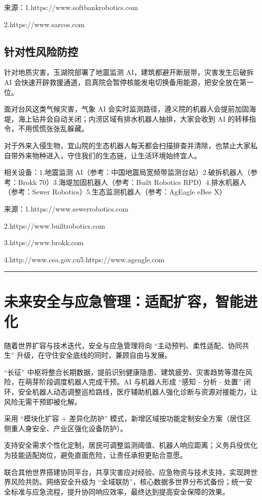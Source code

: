 来源：1.https://www.softbankrobotics.com

2.https://www.sarcos.com

\subsection{针对性风险防控}\label{ux9488ux5bf9ux6027ux98ceux9669ux9632ux63a7}

针对地质灾害，玉湖院部署了地震监测 AI，建筑都避开断层带，灾害发生后破拆 AI 会快速开辟救援通道，启真院会暂停核能发电切换备用能源，把安全放在第一位。

面对台风这类气候灾害，气象 AI 会实时监测路径，遵义院的机器人会提前加固海堤，海上钻井会自动关闭；内涝区域有排水机器人抽排，大家会收到 AI 的转移指令，不用慌慌张张乱躲藏。

对于外来入侵生物，宜山院的生态机器人每天都会扫描排查并清除，也禁止大家私自带外来物种进入，守住我们的生态链，让生活环境始终宜人。

相关设备：1.地震监测 AI（参考：中国地震局宽频带监测台站）2.破拆机器人（参考：Brokk 70）3.海堤加固机器人（参考：Built Robotics RPD）4.排水机器人（参考：Sewer Robotics）5.生态监测机器人（参考：AgEagle eBee X）

来源：1.https://www.sewerrobotics.com

2.https://www.builtrobotics.com

3.https://www.brokk.com

4.http://www.cea.gov.cn5.https://www.ageagle.com

\begin{center}\rule{0.5\linewidth}{0.5pt}\end{center}

\section{未来安全与应急管理：适配扩容，智能进化}\label{ux672aux6765ux5b89ux5168ux4e0eux5e94ux6025ux7ba1ux7406ux9002ux914dux6269ux5bb9ux667aux80fdux8fdbux5316}

随着世界扩容与技术迭代，安全与应急管理将向 ``主动预判、柔性适配、协同共生'' 升级，在守住安全底线的同时，兼顾自由与发展。

``长征'' 中枢将整合长期数据，提前识别健康隐患、建筑疲劳、灾害趋势等潜在风险，在萌芽阶段调度机器人完成干预。AI 与机器人形成 ``感知 - 分析 - 处置'' 闭环，安全机器人动态调整巡检路线，医疗辅助机器人强化诊断与资源对接能力，让风险无需干预即被化解。

采用 ``模块化扩容 + 差异化防护'' 模式，新增区域按功能定制安全方案（居住区侧重人身安全、产业区强化设备防护）。

支持安全需求个性化定制，居民可调整监测阈值、机器人响应距离；义务兵役优化为技能适配岗位，避免直面危险，让责任承担更贴合意愿。

联合其他世界搭建协同平台，共享灾害应对经验、应急物资与技术支持，实现跨世界风险共防。网络安全升级为 ``全域联防''，核心数据多世界分布式备份；统一安全标准与应急流程，提升协同响应效率，最终达到提高安全保障的效果。
